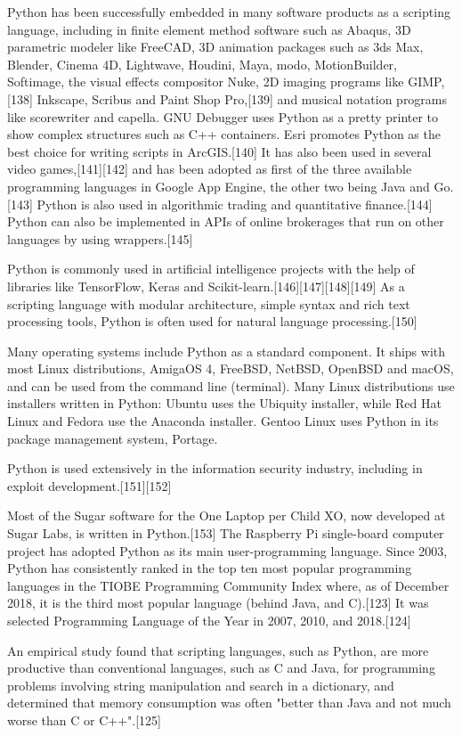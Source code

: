 \documentclass[conference]{IEEEtran} %
\begin{document}
Python has been successfully embedded in many software products as a scripting language, including in finite element method software such as Abaqus, 3D parametric modeler like FreeCAD, 3D animation packages such as 3ds Max, Blender, Cinema 4D, Lightwave, Houdini, Maya, modo, MotionBuilder, Softimage, the visual effects compositor Nuke, 2D imaging programs like GIMP,[138] Inkscape, Scribus and Paint Shop Pro,[139] and musical notation programs like scorewriter and capella. GNU Debugger uses Python as a pretty printer to show complex structures such as C++ containers. Esri promotes Python as the best choice for writing scripts in ArcGIS.[140] It has also been used in several video games,[141][142] and has been adopted as first of the three available programming languages in Google App Engine, the other two being Java and Go.[143] Python is also used in algorithmic trading and quantitative finance.[144] Python can also be implemented in APIs of online brokerages that run on other languages by using wrappers.[145]

Python is commonly used in artificial intelligence projects with the help of libraries like TensorFlow, Keras and Scikit-learn.[146][147][148][149] As a scripting language with modular architecture, simple syntax and rich text processing tools, Python is often used for natural language processing.[150]

Many operating systems include Python as a standard component. It ships with most Linux distributions, AmigaOS 4, FreeBSD, NetBSD, OpenBSD and macOS, and can be used from the command line (terminal). Many Linux distributions use installers written in Python: Ubuntu uses the Ubiquity installer, while Red Hat Linux and Fedora use the Anaconda installer. Gentoo Linux uses Python in its package management system, Portage.

Python is used extensively in the information security industry, including in exploit development.[151][152]

Most of the Sugar software for the One Laptop per Child XO, now developed at Sugar Labs, is written in Python.[153] The Raspberry Pi single-board computer project has adopted Python as its main user-programming language. Since 2003, Python has consistently ranked in the top ten most popular programming languages in the TIOBE Programming Community Index where, as of December 2018, it is the third most popular language (behind Java, and C).[123] It was selected Programming Language of the Year in 2007, 2010, and 2018.[124]

An empirical study found that scripting languages, such as Python, are more productive than conventional languages, such as C and Java, for programming problems involving string manipulation and search in a dictionary, and determined that memory consumption was often "better than Java and not much worse than C or C++".[125]
\end{document}
